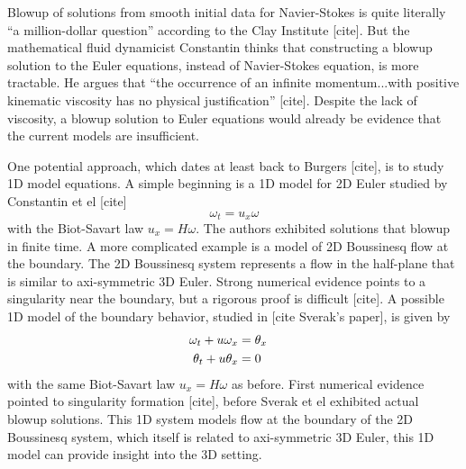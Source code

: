 \documentclass[12pt]{article}
\begin{document}



Blowup of solutions from smooth initial data for Navier-Stokes is quite literally ``a million-dollar question'' according to the Clay Institute [cite]. But the mathematical fluid dynamicist Constantin thinks that constructing a blowup solution to the Euler equations, instead of Navier-Stokes equation,  is more tractable. He argues that ``the occurrence of an infinite momentum...with positive kinematic viscosity has no physical justification'' [cite]. Despite the lack of viscosity, a blowup solution to Euler equations would already be evidence that the current models are insufficient.

One potential approach, which dates at least back to Burgers [cite], is to study 1D model equations. A simple beginning is a 1D model for 2D Euler studied by Constantin et el [cite]
\[
	\label{eq:constantin}
	\omega_t = u_x \omega
\]
with the Biot-Savart law $u_x = H \omega$. The authors exhibited solutions that blowup in finite time. A more complicated example is a model of 2D Boussinesq flow at the boundary. The 2D Boussinesq system represents a flow in the half-plane that is similar to axi-symmetric 3D Euler. Strong numerical evidence points to a singularity near the boundary, but a rigorous proof is difficult [cite]. A possible 1D model of the boundary behavior, studied in [cite Sverak's paper], is given by
\begin{equation*}
	\label{eq:boussinisq_system}
	\begin{aligned}
		\omega_t + u \omega_x &= \theta_x \cr
		\theta_t + u \theta_x &= 0
	\end{aligned}
\end{equation*}
with the same Biot-Savart law $u_x = H \omega$ as before. First numerical evidence pointed to singularity formation [cite], before Sverak et el exhibited actual blowup solutions. This 1D system models flow at the boundary of the 2D Boussinesq system, which itself is related to axi-symmetric 3D Euler, this 1D model can provide insight into the 3D setting.
\end{document}
